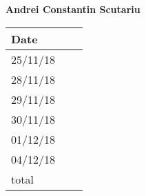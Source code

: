 \documentclass[../main.tex]{subfiles}
\begin{document}
\begin{center}
{\bf Andrei Constantin Scutariu}
	\vspace{2mm}

		\begin{tabular}{p{1.3cm}|p{1.8cm}|p{6.7cm}}
			\hline
			\bf Date & \bf \makebox[1.8cm][c]{Hours} & \bf \makebox[6.7cm][c]{Description} \\
			\hline
			25/11/18 & \makebox[1.8cm][c]{0.5h} & \makebox[6.7cm][c]{Initial Structure}\\
			28/11/18 & \makebox[1.8cm][c]{0.5h} & \makebox[6.7cm][c]{Introduction}\\
			29/11/18 & \makebox[1.8cm][c]{2h} & \makebox[6.7cm][c]{Component view}\\
			30/11/18 & \makebox[1.8cm][c]{1h} & \makebox[6.7cm][c]{Component view}\\
			01/12/18 & \makebox[1.8cm][c]{1h} & \makebox[6.7cm][c]{Requirements traceability}\\
			04/12/18 & \makebox[1.8cm][c]{2h} & \makebox[6.7cm][c]{Reviewing}\\

			total    & \makebox[1.8cm][c]{7h}
		\end{tabular}
\end{center}
\vspace{1cm}
\end{document}
